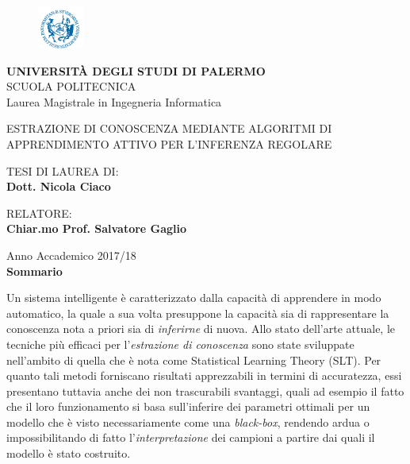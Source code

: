 
\begin{center}
\begin{figure}[!h]
  	\centering
 	\includegraphics[width=1.5cm]{../pictures/frontespizio/logo_unipa_piccolo.png}
\end{figure}
\textsc{\textbf{UNIVERSIT\`A DEGLI STUDI DI PALERMO}} \\
SCUOLA POLITECNICA\\
\small{Laurea Magistrale in Ingegneria Informatica}\\
\end{center}
\begin{center}
\uppercase{Estrazione di conoscenza mediante algoritmi di apprendimento attivo per l'inferenza regolare}
\end{center}

\begin{minipage}[t]{0.65\textwidth}\raggedright
{ \scriptsize{TESI DI LAUREA DI:}\\
\scriptsize{\textbf{Dott. Nicola Ciaco}}
}
\end{minipage}
\begin{minipage}[t]{0.47\textwidth}\raggedright
{\scriptsize{RELATORE:}\\
\scriptsize{\textbf{Chiar.mo Prof. Salvatore Gaglio}}
}
\end{minipage}
\begin{center}
{\small Anno Accademico 2017/18 \\}%
\vspace{3mm}
\small{\textbf{Sommario}}\\
\end{center}


\label{cap:sommario}
Un sistema intelligente è caratterizzato dalla capacità di apprendere in modo automatico, la quale a sua volta presuppone la capacità sia di rappresentare la conoscenza nota a priori sia di \textit{inferirne} di nuova. Allo stato dell'arte attuale, le tecniche più efficaci per l'\textit{estrazione di conoscenza} sono state sviluppate nell'ambito di quella che è nota come Statistical Learning Theory (SLT). Per quanto tali metodi forniscano risultati apprezzabili in termini di accuratezza, essi presentano tuttavia anche dei non trascurabili svantaggi, quali ad esempio il fatto che il loro funzionamento si basa sull'inferire dei parametri ottimali per un modello che è visto necessariamente come una \textit{black-box}, rendendo ardua o impossibilitando di fatto l'\textit{interpretazione} dei campioni a partire dai quali il modello è stato costruito.

